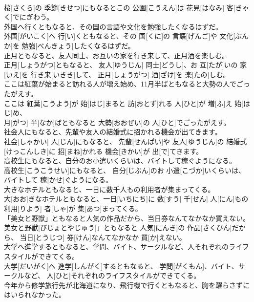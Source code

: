 \documentclass[8pt]{extreport}
\begin{document}
\begin{CJK}{UTF8}{min}
\\	桜[さくら]の 季節[きせつ]にもなるとこの 公園[こうえん]は 花見[はなみ] 客[きゃく]でにぎわう。
\\	外国へ行くともなると、その国の言語や文化を勉強したくなるはずだ。	
\\	外国[がいこく]へ 行[い]くともなると、その 国[くに]の 言語[げんご]や 文化[ぶんか]を 勉強[べんきょう]したくなるはずだ。
\\	正月ともなると、友人同士、お互いの家を行き来して、正月酒を楽しむ。	
\\	正月[しょうがつ]ともなると、 友人[ゆうじん] 同士[どうし]、お 互[たが]いの 家[いえ]を 行き来[いきき]して、 正月[しょうがつ] 酒[ざけ]を 楽[たの]しむ。
\\	ここは紅葉が始まると訪れる人が増え始め、11月半ばともなると大勢の人でごったがえす。	
\\	ここは 紅葉[こうよう]が 始[はじ]まると 訪[おとず]れる 人[ひと]が 増[ふ]え 始[はじ]め、 
\\	月[がつ] 半[なか]ばともなると 大勢[おおぜい]の 人[ひと]でごったがえす。
\\	社会人にもなると、先輩や友人の結婚式に招かれる機会が出てきます。	
\\	社会[しゃかい] 人[じん]にもなると、 先輩[せんぱい]や 友人[ゆうじん]の 結婚式[けっこんしき]に 招[まね]かれる 機会[きかい]が 出[で]てきます。
\\	高校生にもなると、自分のお小遣いくらいは、バイトして稼ぐようになる。	
\\	高校生[こうこうせい]にもなると、 自分[じぶん]のお 小遣[こづか]いくらいは、バイトして 稼[かせ]ぐようになる。
\\	大きなホテルともなると、一日に数千人もの利用者が集まってくる。	
\\	大[おお]きなホテルともなると、一日[いちにち]に 数[すう] 千[せん] 人[にん]もの 利用[りよう] 者[しゃ]が 集[あつ]まってくる。
\\	「美女と野獣」ともなると人気の作品だから、当日券なんてなかなか買えない。	
\\	美女と野獣[びじょとやじゅう]」ともなると 人気[にんき]の 作品[さくひん]だから、 当日[とうじつ] 券[けん]なんてなかなか 買[か]えない。
\\	大学へ進学するともなると、学問、バイト、サークルなど、人それぞれのライフスタイルができてくる。	
\\	大学[だいがく]へ 進学[しんがく]するともなると、 学問[がくもん]、バイト、サークルなど、 人[ひと]それぞれのライフスタイルができてくる。
\\	今年から修学旅行先が北海道になり、飛行機で行くともなると、胸を躍らさずにはいられなかった。	

\end{CJK}
\end{document}
